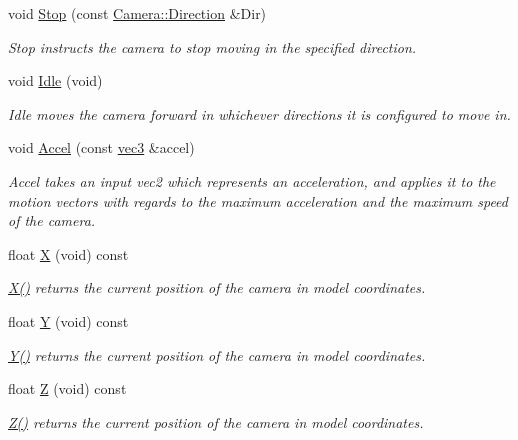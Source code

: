 \begin{DoxyCompactItemize}
void \hyperlink{class_camera_adf064f765f610684e0675bd67de013fd}{Stop} (const \hyperlink{class_camera_a80cb65605322d27ad3b6d973484509ec}{Camera\-::\-Direction} \&Dir)
\begin{DoxyCompactList}\small\item\em Stop instructs the camera to stop moving in the specified direction. \end{DoxyCompactList}\item 
void \hyperlink{class_camera_aec3559fe43597656629fdb00157d3c73}{Idle} (void)
\begin{DoxyCompactList}\small\item\em Idle moves the camera forward in whichever directions it is configured to move in. \end{DoxyCompactList}\item 
void \hyperlink{class_camera_a8eb4ebda2379e7289bb2bb942a2796b4}{Accel} (const \hyperlink{struct_angel_1_1vec3}{vec3} \&accel)
\begin{DoxyCompactList}\small\item\em Accel takes an input vec2 which represents an acceleration, and applies it to the motion vectors with regards to the maximum acceleration and the maximum speed of the camera. \end{DoxyCompactList}\item 
float \hyperlink{class_camera_a2f7fd64d5d6e0dfb5edcca53c7d15994}{X} (void) const 
\begin{DoxyCompactList}\small\item\em \hyperlink{class_camera_a2f7fd64d5d6e0dfb5edcca53c7d15994}{X()} returns the current position of the camera in model coordinates. \end{DoxyCompactList}\item 
float \hyperlink{class_camera_a37529ef93871f547ebfd5862bc6cce62}{Y} (void) const 
\begin{DoxyCompactList}\small\item\em \hyperlink{class_camera_a37529ef93871f547ebfd5862bc6cce62}{Y()} returns the current position of the camera in model coordinates. \end{DoxyCompactList}\item 
float \hyperlink{class_camera_abf1730e47e8e51c76acbddcaa85e2475}{Z} (void) const 
\begin{DoxyCompactList}\small\item\em \hyperlink{class_camera_abf1730e47e8e51c76acbddcaa85e2475}{Z()} returns the current position of the camera in model coordinates. \end{DoxyCompactList}\item 

\end{DoxyCompactItemize}
